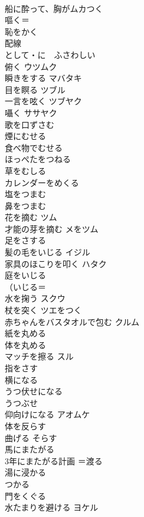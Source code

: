 \documentclass[8pt]{extreport}
\begin{document}
\begin{CJK}{UTF8}{min}
\\	船に酔って、胸がムカつく	
\\	嘔く＝
\\	恥をかく	
\\	配線	
\\	として・に　ふさわしい	
\\	俯く	ウツムク 
\\	瞬きをする	マバタキ 
\\	目を瞑る	ツブル 
\\	一言を呟く	ツブヤク 
\\	囁く	ササヤク 
\\	歌を口ずさむ	
\\	煙にむせる	
\\	食べ物でむせる	
\\	ほっぺたをつねる	
\\	草をむしる	
\\	カレンダーをめくる	
\\	塩をつまむ	
\\	鼻をつまむ	
\\	花を摘む	ツム 
\\	才能の芽を摘む	メをツム 
\\	足をさする	
\\	髪の毛をいじる	イジル 
\\	家具のほこりを叩く	ハタク 
\\	庭をいじる	
\\	（いじる＝
\\	水を掬う	スクウ 
\\	杖を突く	ツエをつく 
\\	赤ちゃんをバスタオルで包む	クルム 
\\	紙を丸める	
\\	体を丸める	
\\	マッチを擦る	スル 
\\	指をさす	
\\	横になる	
\\	うつ伏せになる	
\\	うつぶせ
\\	仰向けになる	アオムケ 
\\	体を反らす
\\	曲げる	そらす 
\\	馬にまたがる	
\\	3年にまたがる計画	＝渡る 
\\	湯に浸かる	
\\	つかる
\\	門をくぐる	
\\	水たまりを避ける	ヨケル 

\end{CJK}
\end{document}
